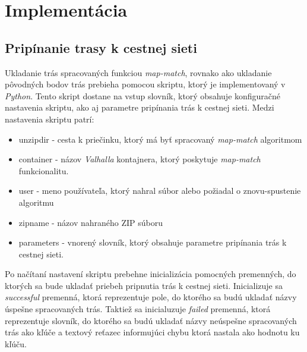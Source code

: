 \section{Implementácia}
\subsection{Pripínanie trasy k cestnej sieti}

\indent \indent Ukladanie trás spracovaných funkciou \textit{map-match}, rovnako ako ukladanie pôvodných bodov trás prebieha pomocou skriptu, ktorý je implementovaný v \textit{Python}. Tento skript dostane na vstup slovník, ktorý obsahuje konfiguračné nastavenia skriptu, ako aj parametre pripínania trás k cestnej sieti. Medzi nastavenia skriptu patrí:
\begin{itemize}
  \item unzipdir - cesta k priečinku, ktorý má byť spracovaný \textit{map-match} algoritmom
  \item container - názov \textit{Valhalla} kontajnera, ktorý poskytuje \textit{map-match} funkcionalitu.
  \item user - meno používateľa, ktorý nahral súbor alebo požiadal o znovu-spustenie algoritmu
  \item zipname - názov nahraného ZIP súboru
  \item parameters - vnorený slovník, ktorý obsahuje parametre pripínania trás k cestnej sieti.
\end{itemize}

Po načítaní nastavení skriptu prebehne inicializácia pomocných premenných, do ktorých sa bude ukladať priebeh pripnutia trás k cestnej sieti. Inicializuje sa \textit{successful} premenná, ktorá reprezentuje pole, do ktorého sa budú ukladať názvy úspešne spracovaných trás. Taktiež sa inicialuzuje \textit{failed} premenná, ktorá reprezentuje slovník, do ktorého sa budú ukladať názvy neúspešne spracovaných trás ako kľúče a textový reťazec informujúci chybu ktorá nastala ako hodnotu ku kľúču.

